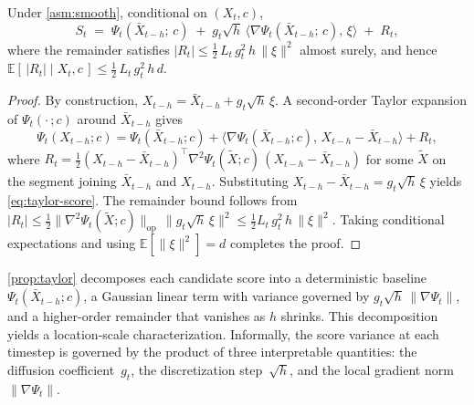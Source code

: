 \begin{proposition}
\label{prop:taylor}
Under \cref{asm:smooth}, conditional on $(X_t, c)$,
\begin{equation}
  S_t \;=\; \Psi_t(\bar{X}_{t-h};\, c)
        \;+\; g_t\sqrt{h}\,
              \bigl\langle \nabla\Psi_t(\bar{X}_{t-h};\, c),\, \xi \bigr\rangle
        \;+\; R_t,
  \label{eq:taylor-score}
\end{equation}
where the remainder satisfies
$|R_t| \le \tfrac{1}{2}\,L_t\,g_t^2\,h\,\|\xi\|^2$ almost surely,
and hence
$\mathbb{E}[\,|R_t|\mid X_t, c\,] \le \tfrac{1}{2}\,L_t\,g_t^2\,h\,d$.
\end{proposition}

\begin{proof}
By construction,
$X_{t-h} = \bar{X}_{t-h} + g_t\sqrt{h}\,\xi$.
A second-order Taylor expansion of $\Psi_t(\cdot\,; c)$ around
$\bar{X}_{t-h}$ gives
\[
  \Psi_t(X_{t-h}; c)
  = \Psi_t(\bar{X}_{t-h}; c)
    + \bigl\langle \nabla\Psi_t(\bar{X}_{t-h}; c),\,
        X_{t-h} - \bar{X}_{t-h} \bigr\rangle
    + R_t,
\]
where
$R_t = \tfrac{1}{2}(X_{t-h} - \bar{X}_{t-h})^\top
  \nabla^2\Psi_t(\widetilde{X}; c)\,
  (X_{t-h} - \bar{X}_{t-h})$
for some $\widetilde{X}$ on the segment joining $\bar{X}_{t-h}$ and $X_{t-h}$.
Substituting $X_{t-h} - \bar{X}_{t-h} = g_t\sqrt{h}\,\xi$ yields
\eqref{eq:taylor-score}.
The remainder bound follows from
$|R_t| \le \tfrac{1}{2}\|\nabla^2\Psi_t(\widetilde{X}; c)\|_{\mathrm{op}}
  \,\|g_t\sqrt{h}\,\xi\|^2
  \le \tfrac{1}{2}L_t\,g_t^2\,h\,\|\xi\|^2$.
Taking conditional expectations and using
$\mathbb{E}[\|\xi\|^2] = d$ completes the proof.
\end{proof}

\cref{prop:taylor} decomposes each candidate score into a deterministic
baseline $\Psi_t(\bar{X}_{t-h}; c)$, a Gaussian linear term with variance
governed by $g_t\sqrt{h}\,\|\nabla\Psi_t\|$, and a higher-order remainder
that vanishes as $h$ shrinks.
This decomposition yields a location-scale characterization.
Informally, the score variance at each timestep is governed by the product of three interpretable quantities: the diffusion coefficient~$g_t$, the discretization step~$\sqrt{h}$, and the local gradient norm~$\|\nabla\Psi_t\|$.

